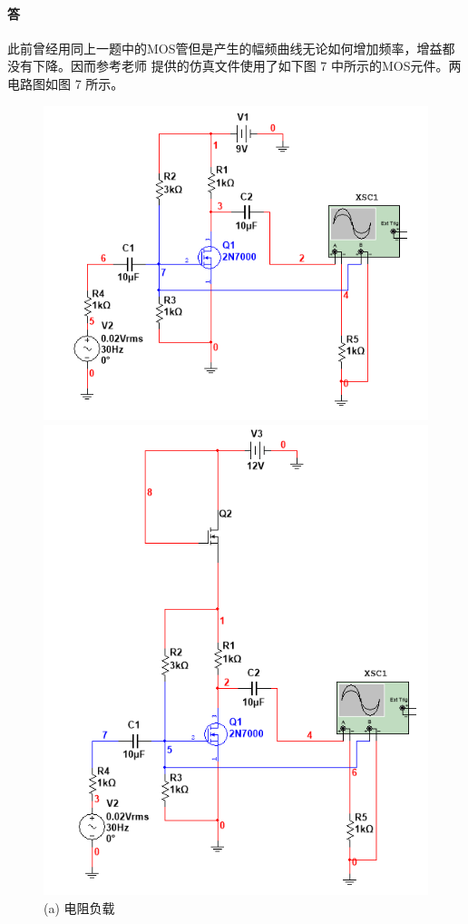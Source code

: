 \documentclass[hyperref, UTF8]{ctexart}
\begin{document}
\paragraph{答}
此前曾经用同上一题中的MOS管但是产生的幅频曲线无论如何增加频率，增益都没有下降。因而参考老师
提供的仿真文件使用了如下图 7 中所示的MOS元件。两电路图如图 7 所示。
\begin{figure}[!htb]
    \centering
    \begin{minipage}[t]{0.354\textwidth}
    \centering
    \includegraphics[width=1\textwidth]{cir2-a.png}
    \caption*{(a) 电阻负载}
    \end{minipage}
    \begin{minipage}[t]{0.349\textwidth}
    \centering
    \includegraphics[width=1\textwidth]{cir2-b.png}

\end{minipage}
\end{figure}
\end{document}
